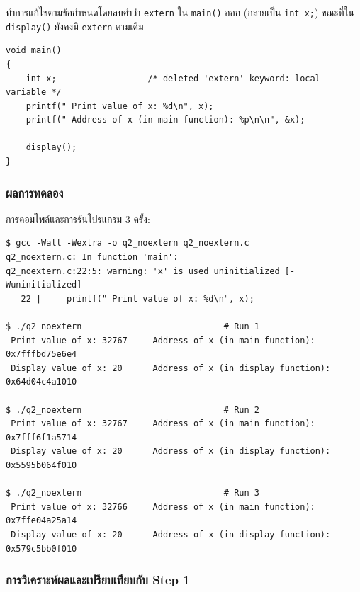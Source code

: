 \documentclass[a4paper,11pt]{article}
\newcommand{\code}[1]{\texttt{#1}}
\begin{document}
ทำการแก้ไขตามข้อกำหนดโดยลบคำว่า \code{extern} ใน \code{main()} ออก (กลายเป็น \code{int x;}) ขณะที่ใน \code{display()} ยังคงมี \code{extern} ตามเดิม

\begin{lstlisting}[style=cstyle,caption={\code{src/q2\_noextern.c} ส่วนที่มีการปรับปรุง}]
void main()
{
    int x;                  /* deleted 'extern' keyword: local variable */
    printf(" Print value of x: %d\n", x);
    printf(" Address of x (in main function): %p\n\n", &x);

    display();
}
\end{lstlisting}

\subsubsection{ผลการทดลอง}

การคอมไพล์และการรันโปรแกรม 3 ครั้ง:

\begin{lstlisting}[style=terminal,caption={ผลการทดลอง Step 2--3 (รัน 3 ครั้ง)}]
$ gcc -Wall -Wextra -o q2_noextern q2_noextern.c
q2_noextern.c: In function 'main':
q2_noextern.c:22:5: warning: 'x' is used uninitialized [-Wuninitialized]
   22 |     printf(" Print value of x: %d\n", x);

$ ./q2_noextern                            # Run 1
 Print value of x: 32767     Address of x (in main function):    0x7fffbd75e6e4
 Display value of x: 20      Address of x (in display function): 0x64d04c4a1010

$ ./q2_noextern                            # Run 2
 Print value of x: 32767     Address of x (in main function):    0x7fff6f1a5714
 Display value of x: 20      Address of x (in display function): 0x5595b064f010

$ ./q2_noextern                            # Run 3
 Print value of x: 32766     Address of x (in main function):    0x7ffe04a25a14
 Display value of x: 20      Address of x (in display function): 0x579c5bb0f010
\end{lstlisting}

\subsubsection{การวิเคราะห์ผลและเปรียบเทียบกับ Step 1}
\end{document}
